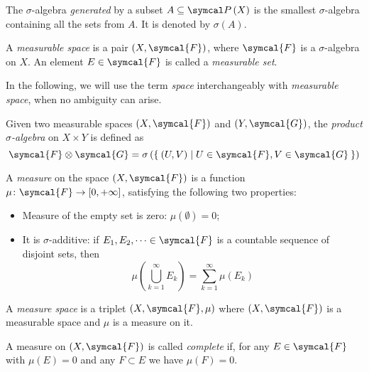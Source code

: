\begin{definition}
The \(\sigma\)-algebra \emph{generated} by a subset \(A \subseteq \powerset{X}\) is the smallest \(\sigma\)-algebra containing all the sets from \(A\). It is denoted by \(\sigma(A)\).
\end{definition}

\begin{definition}
A \emph{measurable space} is a pair \(\left(X, \symcal{F}\right)\), where \(\symcal{F}\) is a \(\sigma\)-algebra on \(X\). An element \(E \in \symcal{F}\) is called a \emph{measurable set}.
\end{definition}

In the following, we will use the term \emph{space} interchangeably with \emph{measurable space}, when no ambiguity can arise.

\begin{definition}
Given two measurable spaces \(\left(X, \symcal{F}\right)\) and \(\left(Y, \symcal{G}\right)\), the \emph{product \(\sigma\)-algebra} on \(X \times Y\) is defined as
\[
    \symcal{F} \otimes \symcal{G} = \sigma\left(\Set{ (U, V) | U \in \symcal{F}, V \in \symcal{G} }\right)
\]
\end{definition}

\begin{definition}[Measure]
A \emph{measure} on the space \(\left(X, \symcal{F}\right)\) is a function \(\mu \colon \symcal{F} \to [0, +\infty]\), satisfying the following two properties:
\begin{itemize}
    \item Measure of the empty set is zero: \(\mu\left(\emptyset\right) = 0\);
    \item It is \(\sigma\)-additive: if \(E_1, E_2, \dots \in \symcal{F}\) is a countable sequence of disjoint sets, then
    \[
        \mu\left(\bigcup_{k = 1}^{\infty} E_{k}\right) = \sum_{k = 1}^{\infty} \mu\left(E_k\right)
    \]
\end{itemize}
\end{definition}

\begin{definition}
A \emph{measure space} is a triplet \(\left(X, \symcal{F}, \mu\right)\) where \(\left(X, \symcal{F}\right)\) is a measurable space and \(\mu\) is a measure on it.
\end{definition}

\begin{definition}
\label{def:complete_measure}

A measure on \(\left(X, \symcal{F}\right)\) is called \emph{complete} if, for any \(E \in \symcal{F}\) with \(\mu(E) = 0\) and any \(F \subset E\) we have \(\mu(F) = 0\).
\end{definition}

